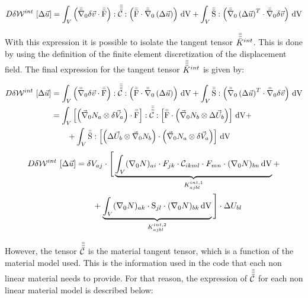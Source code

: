 \begin{equation}
    D \delta \mathcal{W}^{int} \, \left[\Delta \vec{u} \right] = \int_V \left( \bar{\bar{\nabla}}_\mathrm{0} \delta \vec{v} \cdot \bar{\bar{\mathrm{F}}} \right) : \bar{\bar{\bar{\bar{\mathcal{C}}}}} : \left( \bar{\bar{\mathrm{F}}} \cdot \bar{\bar{\nabla}}_\mathrm{0} \left( \Delta \vec{u} \right) \right) \, \mathrm{dV} + \int_V \bar{\bar{\mathrm{S}}} : \left( \bar{\bar{\nabla}}_\mathrm{0} \left( \Delta \vec{u} \right)^{T} \cdot \bar{\bar{\nabla}}_\mathrm{0} \delta \vec{v} \right) \, \mathrm{dV}
\end{equation}

With this expression it is possible to isolate the tangent tensor $\bar{\bar{\bar{\bar{K}}}}^{int}$. This is done by using the definition of the finite element discretization of the displacement field. The final expression for the tangent tensor $\bar{\bar{\bar{\bar{K}}}}^{int}$ is given by:

\begin{align*}
    D \delta \mathcal{W}^{int} \, \left[\Delta \vec{u} \right] &= \int_V \left( \bar{\bar{\nabla}}_\mathrm{0} \delta \vec{v} \cdot \bar{\bar{\mathrm{F}}} \right) : \bar{\bar{\bar{\bar{\mathcal{C}}}}} : \left( \bar{\bar{\mathrm{F}}} \cdot \bar{\bar{\nabla}}_\mathrm{0} \left( \Delta \vec{u} \right) \right) \, \mathrm{dV} + \int_V \bar{\bar{\mathrm{S}}} : \left( \bar{\bar{\nabla}}_\mathrm{0} \left( \Delta \vec{u} \right)^{T} \cdot \bar{\bar{\nabla}}_\mathrm{0} \delta \vec{v} \right) \, \mathrm{dV} \\
    &= \int_V \left[ \left(\vec{\nabla}_\mathrm{0} N_a \otimes \delta \vec{V}_{a} \right) \cdot \bar{\bar{\mathrm{F}}} \right] : \bar{\bar{\bar{\bar{\mathcal{C}}}}} : \left[ \bar{\bar{\mathrm{F}}} \cdot \left(\vec{\nabla}_\mathrm{0} N_b \otimes \Delta \vec{U}_{b} \right) \right] \, \mathrm{dV} + \\
    & \qquad + \int_V \bar{\bar{\mathrm{S}}} : \left[ \left( \Delta \vec{U}_{b} \otimes \vec{\nabla}_\mathrm{0} N_b \right) \cdot \left(\vec{\nabla}_\mathrm{0} N_a \otimes \delta \vec{V}_{a} \right) \right] \, \mathrm{dV} \\
\end{align*}
\begin{equation}
    \begin{split}
        D \delta \mathcal{W}^{int} \, \left[\Delta \vec{u} \right] &= \delta V_{aj} \cdot \Bigg[ \underbrace{\int_V (\nabla_0 N)_{ai} \cdot F_{jk} \cdot \mathcal{C}_{ikml} \cdot F_{mn} \cdot (\nabla_0 N)_{bn} \, \mathrm{dV}}_{K_{ajbl}^{int, 1}} + \\
        & \qquad + \underbrace{\int_V (\nabla_0 N)_{ak}\cdot \mathrm{S}_{jl} \cdot (\nabla_0 N)_{bk} \, \mathrm{dV}}_{K_{ajbl}^{int, 2}} \Bigg] \cdot \Delta U_{bl}
    \end{split}
\end{equation}

However, the tensor $\bar{\bar{\bar{\bar{\mathcal{C}}}}}$ is the material tangent tensor, which is a function of the material model used. This is the information used in the code that each non linear material needs to provide. For that reason, the expression of $\bar{\bar{\bar{\bar{\mathcal{C}}}}}$ for each non linear material model is described below:

